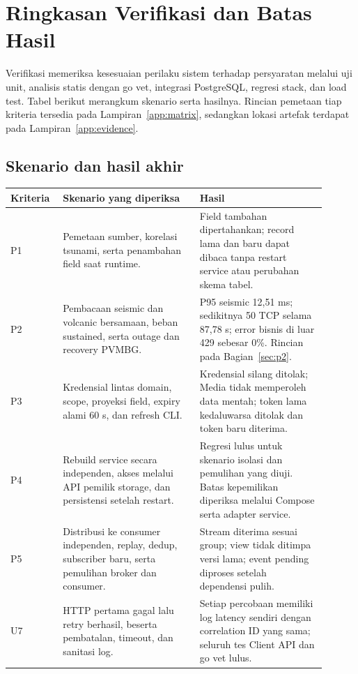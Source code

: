 \section{Ringkasan Verifikasi dan Batas Hasil}
\label{sec:verification}
Verifikasi memeriksa kesesuaian perilaku sistem terhadap persyaratan melalui uji unit, analisis statis dengan go vet, integrasi PostgreSQL, regresi stack, dan load test. Tabel berikut merangkum skenario serta hasilnya. Rincian pemetaan tiap kriteria tersedia pada Lampiran~\ref{app:matrix}, sedangkan lokasi artefak terdapat pada Lampiran~\ref{app:evidence}.

\subsection{Skenario dan hasil akhir}
\begin{longtable}{P{0.13\linewidth}P{0.40\linewidth}P{0.37\linewidth}}
\toprule Kriteria & Skenario yang diperiksa & Hasil\\\midrule\endhead
P1 & Pemetaan sumber, korelasi tsunami, serta penambahan field saat runtime. & Field tambahan dipertahankan; record lama dan baru dapat dibaca tanpa restart service atau perubahan skema tabel.\\
P2 & Pembacaan seismic dan volcanic bersamaan, beban sustained, serta outage dan recovery PVMBG. & P95 seismic 12,51 ms; sedikitnya 50 TCP selama 87,78 s; error bisnis di luar 429 sebesar 0\%. Rincian pada Bagian~\ref{sec:p2}.\\
P3 & Kredensial lintas domain, scope, proyeksi field, expiry alami 60 s, dan refresh CLI. & Kredensial silang ditolak; Media tidak memperoleh data mentah; token lama kedaluwarsa ditolak dan token baru diterima.\\
P4 & Rebuild service secara independen, akses melalui API pemilik storage, dan persistensi setelah restart. & Regresi lulus untuk skenario isolasi dan pemulihan yang diuji. Batas kepemilikan diperiksa melalui Compose serta adapter service.\\
P5 & Distribusi ke consumer independen, replay, dedup, subscriber baru, serta pemulihan broker dan consumer. & Stream diterima sesuai group; view tidak ditimpa versi lama; event pending diproses setelah dependensi pulih.\\
U7 & HTTP pertama gagal lalu retry berhasil, beserta pembatalan, timeout, dan sanitasi log. & Setiap percobaan memiliki log latency sendiri dengan correlation ID yang sama; seluruh tes Client API dan go vet lulus.\\
\bottomrule
\end{longtable}

